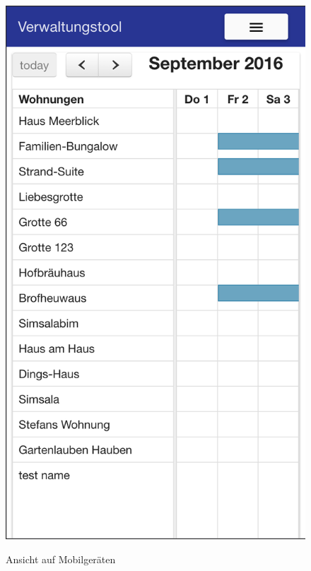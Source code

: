 \begin{figure}[H]
    \centering
    \begin{minipage}[t]{0.49\linewidth}
        \centering
        \includegraphics[width=\linewidth]{images/frontend_header_small.png}
        \label{frontend_header_small}
        \caption{Ansicht auf Mobilgeräten}
    \end{minipage}%
    \hfill
    \begin{minipage}[t]{0.49\linewidth}

\end{minipage}
\end{figure}
